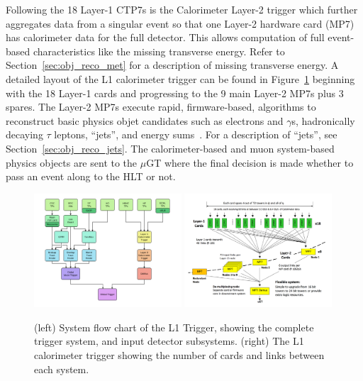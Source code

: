 Following the 18 Layer-1 CTP7s is the Calorimeter Layer-2 trigger which further aggregates
data from a singular event so that one Layer-2 hardware card (MP7) has calorimeter data for
the full detector. This allows computation
of full event-based characteristics like the missing transverse energy. Refer to
Section~\ref{sec:obj_reco_met} for a description of missing transverse energy. A detailed
layout of the L1 calorimeter trigger can be found in Figure~\ref{fig:cms_l1t} beginning
with the 18 Layer-1 cards and progressing to the 9 main Layer-2 MP7s plus 3 spares.
The Layer-2 MP7s execute rapid, firmware-based, algorithms to reconstruct basic physics
objet candidates such as electrons and $\gamma$s, hadronically decaying $\tau$ leptons, 
``jets'', and energy sums~\cite{Cadamuro:2017slr}. For a description of ``jets'', 
see Section~\ref{sec:obj_reco_jets}.
The calorimeter-based and muon system-based physics objects are sent to the $\mu$GT
where the final decision is made whether to pass an event along to the HLT or not.

\begin{figure}[htbp]
\centering
     \includegraphics[width=0.49\textwidth]{cms_and_lhc/plots/cms_l1t_system.pdf}
     \includegraphics[width=0.49\textwidth]{cms_and_lhc/plots/cms_l1t_hardware.pdf}
     \caption{
(left) System flow chart of the L1 Trigger, showing the complete trigger system, and
input detector subsystems.
(right) The L1 calorimeter trigger showing the number of cards and links between
each system.
     }
     \label{fig:cms_l1t}
\end{figure}

